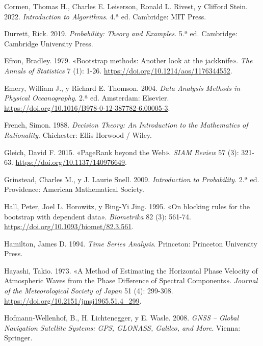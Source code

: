 \documentclass[
  spanish,
  us-letterpaper,
]{scrreprt}
\newlength{\cslhangindent}
\newenvironment{CSLReferences}[2] %
 {\begin{list}{}{%
  \setlength{\itemindent}{0pt}
  \setlength{\leftmargin}{0pt}
  \setlength{\parsep}{0pt}
  \ifodd #1
   \setlength{\leftmargin}{\cslhangindent}
   \setlength{\itemindent}{-1\cslhangindent}
  \fi
  \setlength{\itemsep}{#2\baselineskip}}}
 {\end{list}}
\numberwithin{equation}{section}
\begin{document}
\begin{CSLReferences}{1}{0}
Cormen, Thomas H., Charles E. Leiserson, Ronald L. Rivest, y Clifford
Stein. 2022. \emph{Introduction to Algorithms}. 4.ª ed. Cambridge: MIT
Press.

Durrett, Rick. 2019. \emph{Probability: Theory and Examples}. 5.ª ed.
Cambridge: Cambridge University Press.

Efron, Bradley. 1979. {«Bootstrap methods: Another look at the
jackknife»}. \emph{The Annals of Statistics} 7 (1): 1-26.
\url{https://doi.org/10.1214/aos/1176344552}.

Emery, William J., y Richard E. Thomson. 2004. \emph{Data Analysis
Methods in Physical Oceanography}. 2.ª ed. Amsterdam: Elsevier.
\url{https://doi.org/10.1016/B978-0-12-387782-6.00005-3}.

French, Simon. 1988. \emph{Decision Theory: An Introduction to the
Mathematics of Rationality}. Chichester: Ellis Horwood / Wiley.

Gleich, David F. 2015. {«PageRank beyond the Web»}. \emph{SIAM Review}
57 (3): 321-63. \url{https://doi.org/10.1137/140976649}.

Grinstead, Charles M., y J. Laurie Snell. 2009. \emph{Introduction to
Probability}. 2.ª ed. Providence: American Mathematical Society.

Hall, Peter, Joel L. Horowitz, y Bing-Yi Jing. 1995. {«On blocking rules
for the bootstrap with dependent data»}. \emph{Biometrika} 82 (3):
561-74. \url{https://doi.org/10.1093/biomet/82.3.561}.

Hamilton, James D. 1994. \emph{Time Series Analysis}. Princeton:
Princeton University Press.

Hayashi, Takio. 1973. {«A Method of Estimating the Horizontal Phase
Velocity of Atmospheric Waves from the Phase Difference of Spectral
Components»}. \emph{Journal of the Meteorological Society of Japan} 51
(4): 299-308. \url{https://doi.org/10.2151/jmsj1965.51.4_299}.

Hofmann-Wellenhof, B., H. Lichtenegger, y E. Wasle. 2008. \emph{GNSS --
Global Navigation Satellite Systems: GPS, GLONASS, Galileo, and More}.
Vienna: Springer.


\end{CSLReferences}
\end{document}

